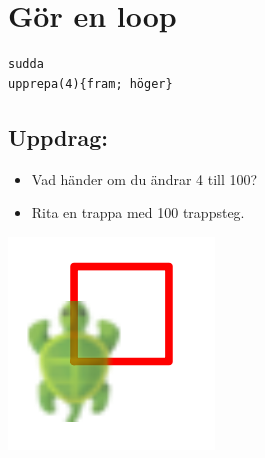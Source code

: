 \chapter{Gör en loop}
\begin{multicols}{2}

\begin{lstlisting}[basicstyle={\ttfamily\fontsize{36.0}{36.0}\selectfont}]
sudda
upprepa(4){fram; höger}
\end{lstlisting}
        
\section*{\color{BrickRed}Uppdrag:}


\begin{itemize}

\item {Vad händer om du ändrar 4 till 100?}
\item {Rita en trappa med 100 trappsteg.}

\end{itemize}



\columnbreak

\begin{center}
\includegraphics{../img/square.png}
\end{center}

\end{multicols}


